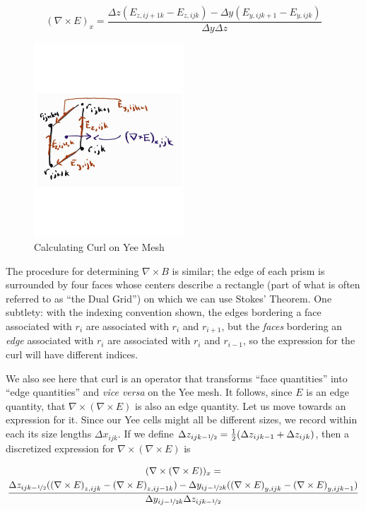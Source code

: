 \documentclass{article}
\newcommand{\Fijk}[5]{{#1}_{{#2},{#3}{#4}{#5}}}
\newcommand{\curl}[1]{\nabla \times {#1}}
\newcommand{\dx}{\Delta x}
\newcommand{\dy}{\Delta y}
\newcommand{\dz}{\Delta z}
\newcommand{\delxe}{(\curl{E})}
\begin{document}
\begin{equation}
(\curl{E})_x = \frac{ \dz (\Fijk{E}{z}{i}{j+1}{k} -
  \Fijk{E}{z}{i}{j}{k}) - \dy (\Fijk{E}{y}{i}{j}{k+1} -
  \Fijk{E}{y}{i}{j}{k}) }{\dy \dz}\label{eq:2}
\end{equation}

\begin{figure}[htbp]
  \centering
  \includegraphics[width=0.5\textwidth]{CurlDiagram.pdf}
  \caption{Calculating Curl on Yee Mesh}
  \label{fig:yeecurl}
\end{figure}

The procedure for determining $\curl{B}$ is similar; the edge of
each prism is surrounded by four faces whose centers describe a
rectangle (part of what is often referred to as ``the Dual Grid'') on
which we can use Stokes' Theorem.  One subtlety: with the indexing
convention shown, the edges bordering a face associated with $r_i$ are associated with $r_i$ and
$r_{i+1}$, but the {\em faces} bordering an {\em edge} associated with
$r_i$ are associated with $r_i$ and $r_{i-1}$, so the expression for
the curl will have different indices.

We  also see here that curl is an
operator that transforms ``face quantities'' into ``edge quantities''
and {\it vice versa} on the Yee mesh.  It follows, since $E$ is an
edge quantity, that $\curl{(\curl{E})}$ is also an edge quantity.  Let
us move towards an expression for it.  Since our Yee cells might all
be different sizes, we record within each its size lengths $\dx_{ijk}$.  If we define
$\dz_{ijk-\nicefrac{1}{2}} = \frac{1}{2} (\dz_{ijk-1} + \dz_{ijk})$,
then a discretized expression for $\curl{\delxe}$ is

\begin{multline}
  (\curl{ \delxe })_x = \\ \frac{\dz_{ijk-\nicefrac{1}{2}}
    (\Fijk{\delxe}{z}{i}{j}{k} - \Fijk{\delxe}{z}{i}{j-1}{k}) -
    \dy_{ij-\nicefrac{1}{2}k} (\Fijk{\delxe}{y}{i}{j}{k} -
    \Fijk{\delxe}{y}{i}{j}{k-1}) }{\dy_{ij-\nicefrac{1}{2}k} \dz_{ijk-\nicefrac{1}{2}} }\label{eq:3}
\end{multline}
\end{document}
